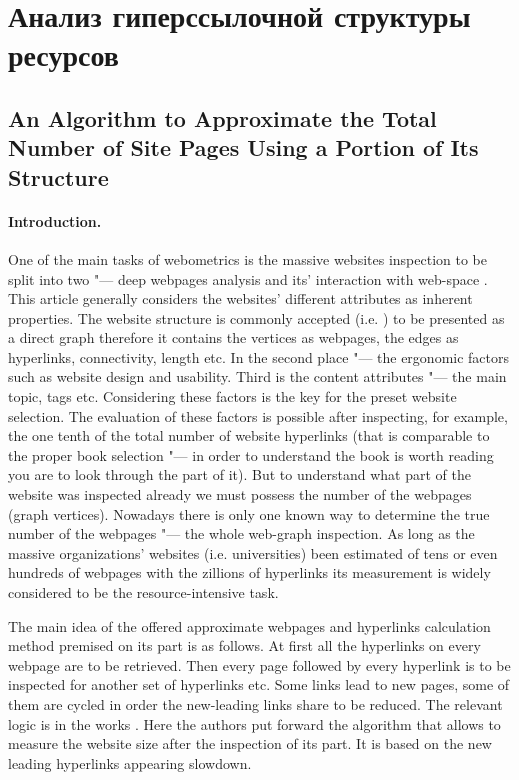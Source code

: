 \section{Анализ гиперссылочной структуры ресурсов}\label{sec:ch1/sec4}

\subsection{An Algorithm to Approximate the Total Number of Site Pages Using a Portion of Its Structure}\label{subsec:ch1/sec4/sub1}

\paragraph{Introduction.} One of the main tasks of webometrics is the massive websites inspection to be split into two "--- deep webpages analysis and its’ interaction with web-space \cite{Thelwall}. This article generally considers the websites’ different attributes as inherent properties. The website structure is commonly accepted (i.e. \cite{BroderKumarMaghoul}) to be presented as a direct graph therefore it contains the vertices as webpages, the edges as hyperlinks, connectivity, length etc. In the second place "--- the ergonomic factors such as website design and usability. Third is the content attributes "--- the main topic, tags etc. Considering these factors is the key for the preset website selection. The evaluation of these factors is possible after inspecting, for example, the one tenth of the total number of website hyperlinks (that is comparable to the proper book selection "--- in order to understand the book is worth reading you are to look through the part of it). But to understand what part of the website was inspected already we must possess the number of the webpages (graph vertices). Nowadays there is only one known way to determine the true number of the webpages "--- the whole web-graph inspection. As long as the massive organizations’ websites (i.e. universities) been estimated of tens or even hundreds of webpages with the zillions of hyperlinks its measurement is widely considered to be the resource-intensive task.

The main idea of the offered approximate webpages and hyperlinks calculation method premised on its part is as follows. At first all the hyperlinks on every webpage are to be retrieved. Then every page followed by every hyperlink is to be inspected for another set of hyperlinks etc. Some links lead to new pages, some of them are cycled in order the new-leading links share to be reduced. The relevant logic is in the works \cite{BlekanovSergeevKlemeshov,BlekanovSergeevMaksimov2016}. Here the authors put forward the algorithm that allows to measure the website size after the inspection of its part. It is based on the new leading hyperlinks appearing slowdown.

